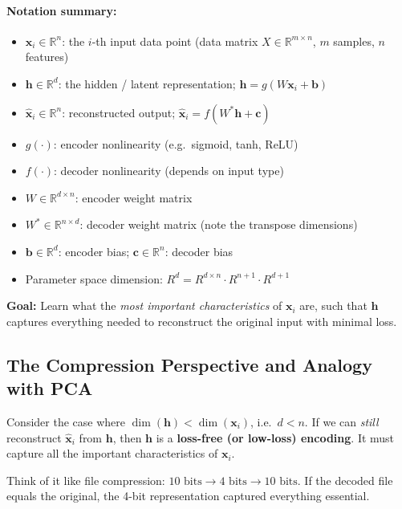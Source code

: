 \documentclass[12pt,a4paper]{article}
\newcommand{\R}{\mathbb{R}}
\newcommand{\vx}{\mathbf{x}}
\newcommand{\vh}{\mathbf{h}}
\newcommand{\vb}{\mathbf{b}}
\newcommand{\vc}{\mathbf{c}}
\newcommand{\hatx}{\hat{\mathbf{x}}}
\begin{document}
\paragraph{Notation summary:}
\begin{itemize}
  \item $\vx_i \in \R^n$: the $i$-th input data point (data matrix $X \in \R^{m\times n}$, $m$ samples, $n$ features)
  \item $\vh \in \R^d$: the hidden / latent representation; $\vh = g(W\vx_i + \vb)$
  \item $\hatx_i \in \R^n$: reconstructed output; $\hatx_i = f(W^*\vh + \vc)$
  \item $g(\cdot)$: encoder nonlinearity (e.g.\ sigmoid, tanh, ReLU)
  \item $f(\cdot)$: decoder nonlinearity (depends on input type)
  \item $W \in \R^{d \times n}$: encoder weight matrix
  \item $W^* \in \R^{n \times d}$: decoder weight matrix (note the transpose dimensions)
  \item $\vb \in \R^d$: encoder bias; $\vc \in \R^n$: decoder bias
  \item Parameter space dimension: $R^d = R^{d\times n} \cdot R^{n+1} \cdot R^{d+1}$
\end{itemize}

\begin{keybox}
\textbf{Goal:} Learn what the \emph{most important characteristics} of $\vx_i$ are, such that $\vh$ captures everything needed to reconstruct the original input with minimal loss.
\end{keybox}

\subsection{The Compression Perspective and Analogy with PCA}

Consider the case where $\dim(\vh) < \dim(\vx_i)$, i.e.\ $d < n$. If we can \emph{still} reconstruct $\hatx_i$ from $\vh$, then $\vh$ is a \textbf{loss-free (or low-loss) encoding}. It must capture all the important characteristics of $\vx_i$.

\begin{examplebox}
Think of it like file compression: $10\text{ bits} \to 4\text{ bits} \to 10\text{ bits}$. If the decoded file equals the original, the 4-bit representation captured everything essential.
\end{examplebox}
\end{document}
